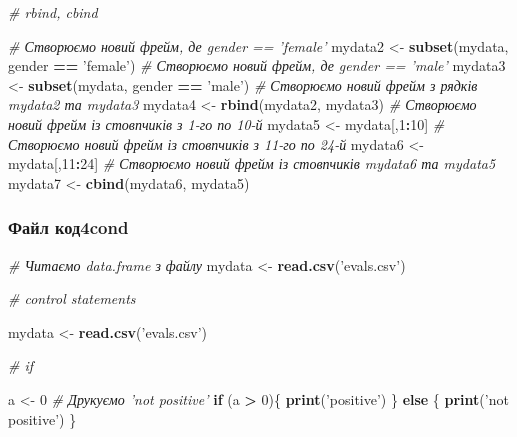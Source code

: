 \documentclass[
]{article}
\newenvironment{Shaded}{\begin{snugshade}}{\end{snugshade}}
\newcommand{\CommentTok}[1]{\textcolor[rgb]{0.56,0.35,0.01}{\textit{#1}}}
\newcommand{\ControlFlowTok}[1]{\textcolor[rgb]{0.13,0.29,0.53}{\textbf{#1}}}
\newcommand{\DecValTok}[1]{\textcolor[rgb]{0.00,0.00,0.81}{#1}}
\newcommand{\KeywordTok}[1]{\textcolor[rgb]{0.13,0.29,0.53}{\textbf{#1}}}
\newcommand{\NormalTok}[1]{#1}
\newcommand{\OperatorTok}[1]{\textcolor[rgb]{0.81,0.36,0.00}{\textbf{#1}}}
\newcommand{\StringTok}[1]{\textcolor[rgb]{0.31,0.60,0.02}{#1}}
\begin{document}
\begin{Shaded}
\begin{Highlighting}[]
\CommentTok{# rbind, cbind}

\CommentTok{# Створюємо новий фрейм, де gender == 'female'}
\NormalTok{mydata2 <-}\StringTok{ }\KeywordTok{subset}\NormalTok{(mydata, gender }\OperatorTok{==}\StringTok{ 'female'}\NormalTok{)}
\CommentTok{# Створюємо новий фрейм, де gender == 'male'}
\NormalTok{mydata3 <-}\StringTok{ }\KeywordTok{subset}\NormalTok{(mydata, gender }\OperatorTok{==}\StringTok{ 'male'}\NormalTok{)}
\CommentTok{# Створюємо новий фрейм з рядків mydata2 та mydata3}
\NormalTok{mydata4 <-}\StringTok{ }\KeywordTok{rbind}\NormalTok{(mydata2, mydata3)}
\CommentTok{# Створюємо новий фрейм із стовпчиків з 1-го по 10-й}
\NormalTok{mydata5 <-}\StringTok{ }\NormalTok{mydata[,}\DecValTok{1}\OperatorTok{:}\DecValTok{10}\NormalTok{]}
\CommentTok{# Створюємо новий фрейм із стовпчиків з 11-го по 24-й}
\NormalTok{mydata6 <-}\StringTok{ }\NormalTok{mydata[,}\DecValTok{11}\OperatorTok{:}\DecValTok{24}\NormalTok{]}
\CommentTok{# Створюємо новий фрейм із стовпчиків mydata6 та mydata5}
\NormalTok{mydata7 <-}\StringTok{ }\KeywordTok{cbind}\NormalTok{(mydata6, mydata5)}
\end{Highlighting}
\end{Shaded}

\hypertarget{ux444ux430ux439ux43b-ux43aux43eux4344cond}{%
\subsubsection{Файл
код4cond}\label{ux444ux430ux439ux43b-ux43aux43eux4344cond}}

\begin{Shaded}
\begin{Highlighting}[]
\CommentTok{# Читаємо data.frame з файлу}
\NormalTok{mydata <-}\StringTok{ }\KeywordTok{read.csv}\NormalTok{(}\StringTok{'evals.csv'}\NormalTok{)}
\end{Highlighting}
\end{Shaded}

\begin{Shaded}
\begin{Highlighting}[]
\CommentTok{# control statements}

\NormalTok{mydata <-}\StringTok{ }\KeywordTok{read.csv}\NormalTok{(}\StringTok{'evals.csv'}\NormalTok{)}

\CommentTok{# if}

\NormalTok{a <-}\StringTok{ }\DecValTok{0}
\CommentTok{# Друкуємо 'not positive'}
\ControlFlowTok{if}\NormalTok{ (a }\OperatorTok{>}\StringTok{ }\DecValTok{0}\NormalTok{)\{}
  \KeywordTok{print}\NormalTok{(}\StringTok{'positive'}\NormalTok{)}
\NormalTok{\} }\ControlFlowTok{else}\NormalTok{ \{}
  \KeywordTok{print}\NormalTok{(}\StringTok{'not positive'}\NormalTok{)}
\NormalTok{\}}
\end{Highlighting}
\end{Shaded}
\end{document}
